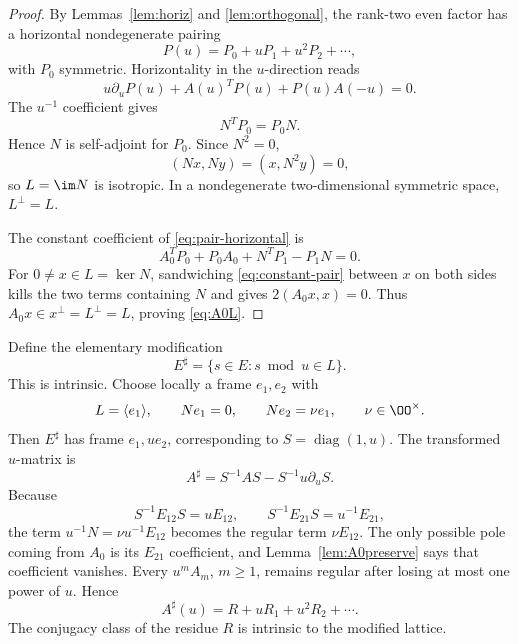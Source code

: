 \begin{proof}
By Lemmas~\ref{lem:horiz} and \ref{lem:orthogonal}, the rank-two even factor
has a horizontal nondegenerate pairing
\[
  P(u)=P_0+uP_1+u^2P_2+\cdots,
\]
with $P_0$ symmetric.  Horizontality in the $u$-direction reads
\begin{equation}\label{eq:pair-horizontal}
  u\partial_uP(u)+A(u)^TP(u)+P(u)A(-u)=0.
\end{equation}
The $u^{-1}$ coefficient gives
\begin{equation}\label{eq:Nself}
  N^TP_0=P_0N.
\end{equation}
Hence $N$ is self-adjoint for $P_0$.  Since $N^2=0$,
\[
  (Nx,Ny)=(x,N^2y)=0,
\]
so $L=\im N$ is isotropic.  In a nondegenerate two-dimensional symmetric
space, $L^\perp=L$.

The constant coefficient of \eqref{eq:pair-horizontal} is
\begin{equation}\label{eq:constant-pair}
 A_0^TP_0+P_0A_0+N^TP_1-P_1N=0.
\end{equation}
For $0\ne x\in L=\ker N$, sandwiching
\eqref{eq:constant-pair} between $x$ on both sides kills the two terms
containing $N$ and gives $2(A_0x,x)=0$.  Thus
$A_0x\in x^\perp=L^\perp=L$, proving \eqref{eq:A0L}.
%
\end{proof}

Define the elementary modification
\begin{equation}\label{eq:Emod}
  E^\sharp=\{s\in E:s\bmod u\in L\}.
\end{equation}
This is intrinsic.  Choose locally a frame $e_1,e_2$ with
\begin{equation}\label{eq:adapted}
  L=\langle e_1\rangle,\qquad
  Ne_1=0,
  \qquad Ne_2=\nu e_1,
  \qquad \nu\in\OO^\times.
\end{equation}
Then $E^\sharp$ has frame $e_1,ue_2$, corresponding to
$S=\operatorname{diag}(1,u)$.  The transformed $u$-matrix is
\begin{equation}\label{eq:Asharp}
  A^\sharp=S^{-1}AS-S^{-1}u\partial_uS.
\end{equation}
Because
\[
  S^{-1}E_{12}S=uE_{12},\qquad
  S^{-1}E_{21}S=u^{-1}E_{21},
\]
the term $u^{-1}N=\nu u^{-1}E_{12}$ becomes the regular term
$\nu E_{12}$.  The only possible pole coming from $A_0$ is its
$E_{21}$ coefficient, and Lemma~\ref{lem:A0preserve} says that coefficient
vanishes.  Every $u^mA_m$, $m\ge1$, remains regular after losing at most one
power of $u$.  Hence
\begin{equation}\label{eq:Rexp}
  A^\sharp(u)=R+uR_1+u^2R_2+\cdots.
\end{equation}
The conjugacy class of the residue $R$ is intrinsic to the modified lattice.

